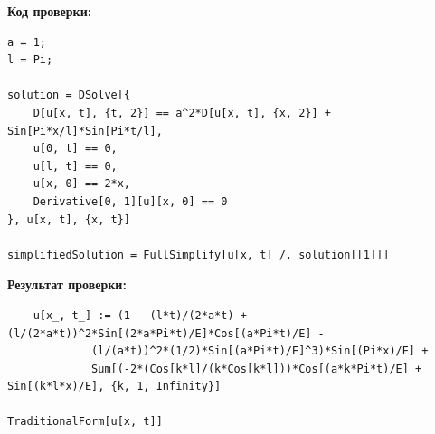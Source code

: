 \documentclass[a4paper,12pt]{article}
\begin{document}
\textbf{Код проверки:}
\begin{lstlisting}
a = 1;  
l = Pi; 

solution = DSolve[{
    D[u[x, t], {t, 2}] == a^2*D[u[x, t], {x, 2}] + Sin[Pi*x/l]*Sin[Pi*t/l],
    u[0, t] == 0,
    u[l, t] == 0,
    u[x, 0] == 2*x,
    Derivative[0, 1][u][x, 0] == 0
}, u[x, t], {x, t}]

simplifiedSolution = FullSimplify[u[x, t] /. solution[[1]]]
\end{lstlisting}

\textbf{Результат проверки:}
\begin{lstlisting}
    u[x_, t_] := (1 - (l*t)/(2*a*t) + (l/(2*a*t))^2*Sin[(2*a*Pi*t)/E]*Cos[(a*Pi*t)/E] - 
             (l/(a*t))^2*(1/2)*Sin[(a*Pi*t)/E]^3)*Sin[(Pi*x)/E] + 
             Sum[(-2*(Cos[k*l]/(k*Cos[k*l]))*Cos[(a*k*Pi*t)/E] + Sin[(k*l*x)/E], {k, 1, Infinity}]

TraditionalForm[u[x, t]]
\end{lstlisting}
\end{document}
